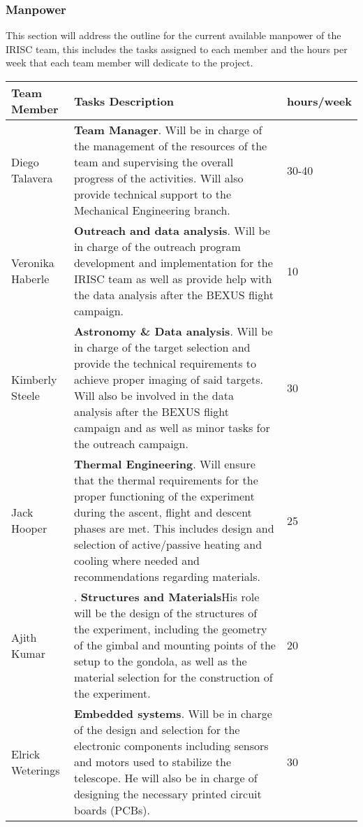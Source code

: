 \subsubsection{Manpower}

This section will address the outline for the current available manpower of the IRISC team, this includes the tasks assigned to each member and the hours per week that each team member will dedicate to the project.

\begin{longtable}{m{} | m{} | m{}}
	\textbf{Team Member} & \textbf{Tasks Description} & \textbf{hours/week} \\ \hline
	Diego Talavera  & \textbf{Team Manager}. Will be in charge of the management of the resources of the team and supervising the overall progress of the activities. Will also provide technical support to the Mechanical Engineering branch. &  30-40 \\ \hline
	Veronika Haberle & \textbf{Outreach and data analysis}. Will be in charge of the outreach program development and implementation for the IRISC team as well as provide help with the data analysis after the BEXUS flight campaign. & 10 \\ \hline
	Kimberly Steele & \textbf{Astronomy \& Data analysis}. Will be in charge of the target selection and provide the technical requirements to achieve proper imaging of said targets. Will also be involved in the data analysis after the BEXUS flight campaign and as well as minor tasks for the outreach campaign. & 30 \\ \hline
	Jack Hooper & \textbf{Thermal Engineering}. Will ensure that the thermal requirements for the proper functioning of the experiment during the ascent, flight and descent phases are met. This includes design and selection of active/passive heating and cooling where needed and recommendations regarding materials. & 25 \\ \hline
	Ajith Kumar & . \textbf{Structures and Materials}His role will be the design of the structures of the experiment, including the geometry of the gimbal and mounting points of the setup to the gondola, as well as the material selection for the construction of the experiment. & 20 \\ \hline
	Elrick Weterings & \textbf{Embedded systems}. Will be in charge of the design and selection for the electronic components including sensors and motors used to stabilize the telescope. He will also be in charge of designing the necessary printed circuit boards (PCBs). & 30 \\ \hline

\end{longtable}
